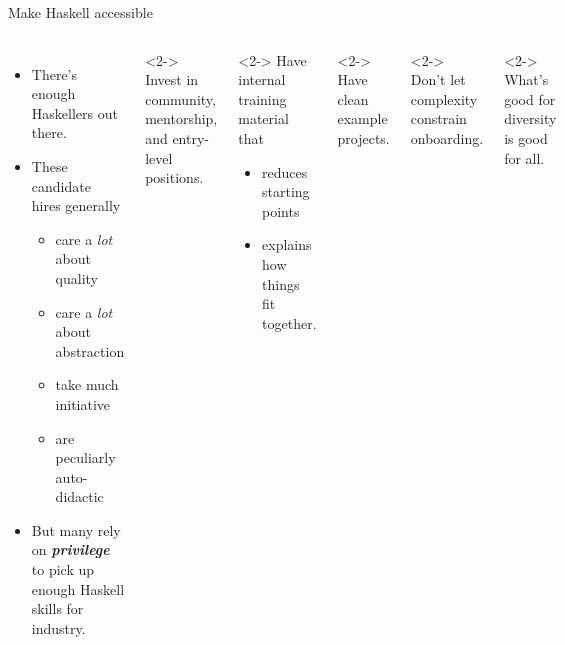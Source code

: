 \documentclass[aspectratio=169,ignorenonframetext]{beamer}
\begin{document}
\begin{frame}{Make Haskell accessible}
	\begin{columns}
		\begin{itemize}
			\item There's enough Haskellers out there.
			\item These candidate hires generally
			      \begin{itemize}
				      \item care a \emph{lot} about quality
				      \item care a \emph{lot} about abstraction
				      \item take much initiative
				      \item are peculiarly auto-didactic
			      \end{itemize}
			\item But many rely on \emph{\textbf{\alert{privilege}}} to pick up
			      enough Haskell skills for industry.
		\end{itemize}
		\begin{exampleblock}<2->{}
			Invest in community, mentorship, and entry-level positions.
		\end{exampleblock}
		\begin{exampleblock}<2->{}
			Have internal training material that
			\begin{itemize}
				\item reduces starting points
				\item explains how things fit together.
			\end{itemize}
		\end{exampleblock}
		\begin{exampleblock}<2->{}
			Have clean example projects.
		\end{exampleblock}
		\begin{exampleblock}<2->{}
			Don't let complexity constrain onboarding.
		\end{exampleblock}
		\begin{exampleblock}<2->{}
			What's good for diversity is good for all.
		\end{exampleblock}
	\end{columns}
\end{frame}
\end{document}
